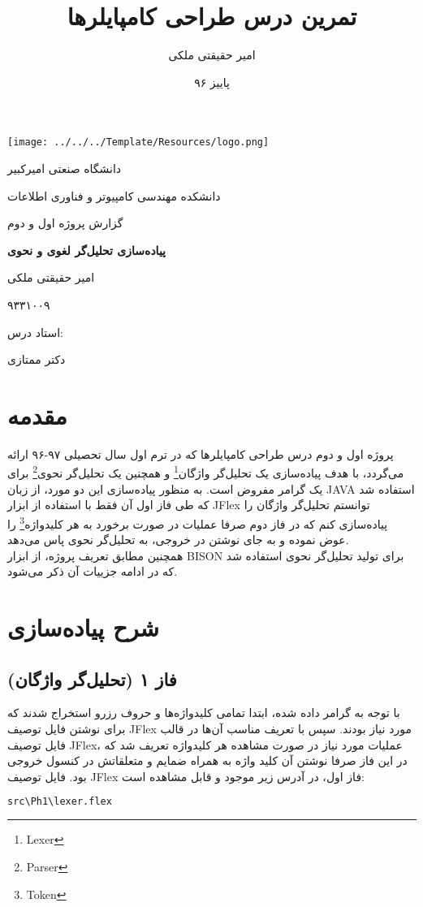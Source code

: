 \documentclass{article}
\title{تمرین درس طراحی کامپایلرها}
\author{امیر حقیقتی ملکی}
\date{پاییز ۹۶}
\theoremstyle{definition}
\begin{document}
		\begin{titlepage}
		\centering
		\texttt{[image: ../../../Template/Resources/logo.png]}\par\vspace{1cm}
		{\scshape\LARGE دانشگاه صنعتی امیرکبیر \par}
		{\scshape\LARGE دانشکده مهندسی کامپیوتر و فناوری اطلاعات \par}
		\vspace{1cm}
		{\scshape\Large
	گزارش پروژه اول و دوم
			\par}
		\vspace{1.5cm}
		{\huge\bfseries 
			پیاده‌سازی تحلیل‌گر لغوی و نحوی
			\par}
		\vspace{2cm}
		{\Large امیر حقیقتی ملکی \par}
		{\Large ۹۳۳۱۰۰۹\par}
		\vfill
		استاد درس:\par
		دکتر ممتازی
		\vfill
		
		{\large {}\par}
	\end{titlepage}
	\newpage
	\tableofcontents
	\newpage
	\section{مقدمه}
	پروژه اول و دوم درس طراحی کامپایلرها که در ترم اول سال تحصیلی ۹۷-۹۶ ارائه می‌گردد، با هدف پیاده‌سازی یک تحلیل‌گر واژگان\footnote{Lexer} و همچنین یک تحلیل‌گر نحوی\footnote{Parser} برای یک گرامر مفروض است. به منظور پیاده‌سازی این دو مورد،  از زبان JAVA استفاده شد که طی فاز اول آن فقط با استفاده از ابزار  JFlex توانستم تحلیل‌گر واژگان را پیاده‌سازی کنم که در فاز دوم صرفا عملیات در صورت برخورد به هر کلیدواژه\footnote{Token} را عوض نموده و به جای نوشتن در خروجی، به تحلیل‌گر نحوی پاس می‌دهد. \\
	همچنین مطابق تعریف پروژه، از ابزار BISON برای تولید تحلیل‌گر نحوی استفاده شد که در ادامه جزییات آن ذکر می‌شود.
	\section{شرح پیاده‌سازی}
	\subsection{فاز ۱ (تحلیل‌گر واژگان)}
	با توجه به گرامر داده شده، ابتدا تمامی کلیدواژه‌ها و حروف رزرو استخراج شدند که برای نوشتن فایل توصیف JFlex مورد نیاز بودند. سپس با تعریف مناسب آن‌ها در قالب فایل توصیف JFlex، عملیات مورد نیاز در صورت مشاهده هر کلیدواژه تعریف شد که در این فاز صرفا نوشتن آن کلید واژه به همراه ضمایم و متعلقاتش در کنسول خروجی بود. فایل توصیف JFlex فاز اول،‌ در آدرس زیر موجود و قابل مشاهده است:
	\begin{latin}
\begin{lstlisting}[language=bash]
src\Ph1\lexer.flex
\end{lstlisting}
	\end{latin}
\end{document}
